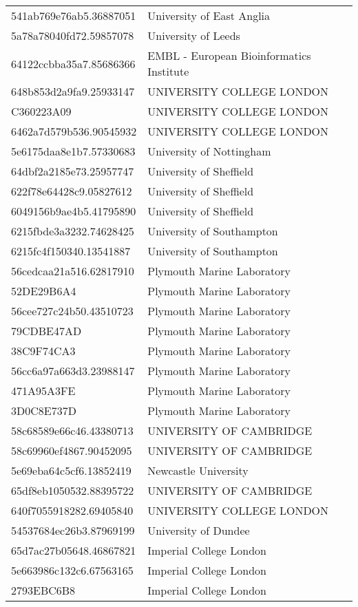 \begin{tabular}{ll}
541ab769e76ab5.36887051 & University of East Anglia \\
5a78a78040fd72.59857078 & University of Leeds \\
64122ccbba35a7.85686366 & EMBL - European Bioinformatics Institute \\
648b853d2a9fa9.25933147 & UNIVERSITY COLLEGE LONDON \\
C360223A09 & UNIVERSITY COLLEGE LONDON \\
6462a7d579b536.90545932 & UNIVERSITY COLLEGE LONDON \\
5e6175daa8e1b7.57330683 & University of Nottingham \\
64dbf2a2185e73.25957747 & University of Sheffield \\
622f78e64428c9.05827612 & University of Sheffield \\
6049156b9ae4b5.41795890 & University of Sheffield \\
6215fbde3a3232.74628425 & University of Southampton \\
6215fc4f150340.13541887 & University of Southampton \\
56cedcaa21a516.62817910 & Plymouth Marine Laboratory \\
52DE29B6A4 & Plymouth Marine Laboratory \\
56cee727c24b50.43510723 & Plymouth Marine Laboratory \\
79CDBE47AD & Plymouth Marine Laboratory \\
38C9F74CA3 & Plymouth Marine Laboratory \\
56cc6a97a663d3.23988147 & Plymouth Marine Laboratory \\
471A95A3FE & Plymouth Marine Laboratory \\
3D0C8E737D & Plymouth Marine Laboratory \\
58c68589e66c46.43380713 & UNIVERSITY OF CAMBRIDGE \\
58c69960ef4867.90452095 & UNIVERSITY OF CAMBRIDGE \\
5e69eba64c5cf6.13852419 & Newcastle University \\
65df8eb1050532.88395722 & UNIVERSITY OF CAMBRIDGE \\
640f7055918282.69405840 & UNIVERSITY COLLEGE LONDON \\
54537684ec26b3.87969199 & University of Dundee \\
65d7ac27b05648.46867821 & Imperial College London \\
5e663986c132c6.67563165 & Imperial College London \\
2793EBC6B8 & Imperial College London \\

\end{tabular}
